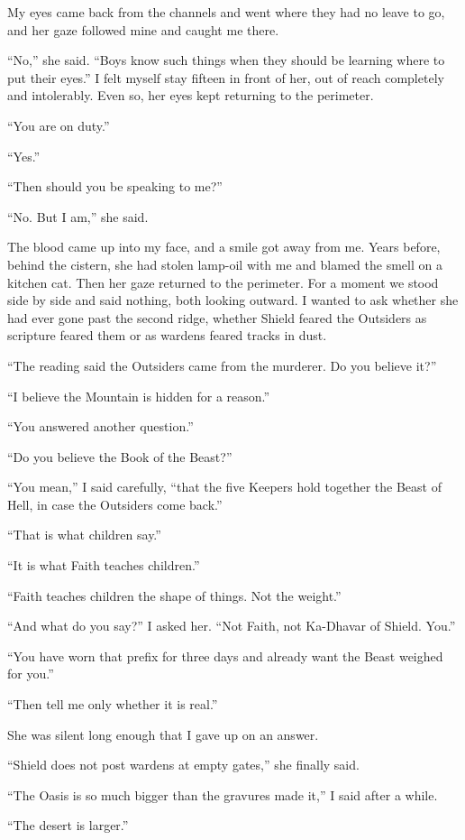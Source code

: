 My eyes came back from the channels and went where they had no leave to go, and her gaze followed mine and caught me there.\par

``No,'' she said. ``Boys know such things when they should be learning where to put their eyes.'' I felt myself stay fifteen in front of her, out of reach completely and intolerably. Even so, her eyes kept returning to the perimeter.\par

``You are on duty.''\par
``Yes.''\par
``Then should you be speaking to me?''\par
``No. But I am,'' she said.\par

The blood came up into my face, and a smile got away from me. Years before, behind the cistern, she had stolen lamp-oil with me and blamed the smell on a kitchen cat. Then her gaze returned to the perimeter. For a moment we stood side by side and said nothing, both looking outward. I wanted to ask whether she had ever gone past the second ridge, whether Shield feared the Outsiders as scripture feared them or as wardens feared tracks in dust. \par

``The reading said the Outsiders came from the murderer. Do you believe it?''\par
``I believe the Mountain is hidden for a reason.''\par
``You answered another question.''\par
``Do you believe the Book of the Beast?''\par
``You mean,'' I said carefully, ``that the five Keepers hold together the Beast of Hell, in case the Outsiders come back.''\par
``That is what children say.''\par
``It is what Faith teaches children.''\par
``Faith teaches children the shape of things. Not the weight.''\par

``And what do you say?'' I asked her. ``Not Faith, not Ka-Dhavar of Shield. You.''\par
``You have worn that prefix for three days and already want the Beast weighed for you.''\par
``Then tell me only whether it is real.''\par
She was silent long enough that I gave up on an answer.\par
``Shield does not post wardens at empty gates,'' she finally said.\par
``The Oasis is so much bigger than the gravures made it,'' I said after a while.\par
``The desert is larger.''\par

